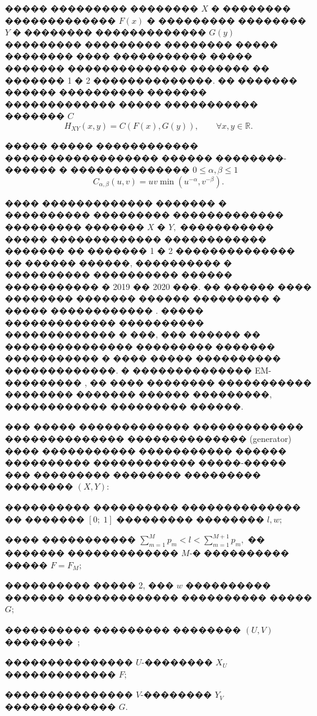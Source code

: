 \documentclass[11pt]{ubs}
\begin{document}
����� ��������� �������� $X$ � �������� ������������� $F(x)$ �   ��������� �������� $ Y$ � �������� ������������� $G (y)$ ��������� ��������� �������� ����� �������� ���� ����������� ����� ������� �������������� ������� �� ������� 1 � 2 ��������������.
�� ������� ������ \cite{nelsen2006introduction} ���������� ������� ������������� ����� ����������� ������� $C$
\begin{equation}\label{eq:Copula_H}
  H_{XY}(x,y)=C(F (x), G(y)), \qquad \forall x,y\in \mathbb{R}.
\end{equation}
\noindent



�����   ����� ������������ ������������������ ������ ��������-��\-��\-�� \cite{marshall1996copulas, Quesada} � �������������� $0\leqslant\alpha,\beta\leqslant1$
\begin{equation} \label{eq:copula}
  C_{\alpha,\beta}(u,v)=uv \min {(u^{-\alpha},v^{-\beta} )}.
\end{equation}


���� ������������� ������� � ���������� ��������� ������������� ��������� ������� $X$ � $Y,$ ����������� ����� ������������� ������������ ������� �� ������� 1 � 2 �������������� �� ������ ������, ���������� � ���������� ���������� ������ ����������� � 2019 �� 2020 ���. 
�� ������ ���� �������� ������� ������ ��������� � ����� ������������ \cite{Epanechnikov}. ����� ������������� ���������� ������������� � ���, ��� ������ �� ��������������� ��������� ������� ����������� � ���� ����� ���������� �������������. 
� �������������� EM-��������� \cite{EM}, �� ���� �������� ����������� �������� ������� ������ ���������, ������������ ��������� ������.



��� ����� ������������� �������������  �������������� �������������� (generator) ���� ����������� ����������� ������ ���������� ������������ �����-����� ���  ���������  �������� ��������� �������� $(X,Y)$:
\begin{description}[itemsep=-3pt]
  \item [\sf{���� 1:}] ���������� ���������� �������������� �� ������� $[0;\;1]$ ��������� �������� ${l}, {w};$
  \item [\sf{���� 2:}] ���� ����������� $\sum\limits_{m=1}^{M} p_m <{l}< \sum\limits_{m=1}^{M+1}p_m,$ �� ������� ������������� $M$-� ���������� �����  $F = F_M;$
  \item [\sf{���� 3:}] ���������� ����� 2, ��� ${w}$ ���������� ������� ������������� ���������� ����� $G;$
  \item [\sf{���� 4:}] ���������� ��������� �������� $(U,V)$ ��������~{\cite{nelsen2006introduction}};
  \item [\sf{���� 5:}] ��������������� $U$-�������� $X_U$ ������������� $F;$
  \item [\sf{���� 6:}] ��������������� $V$-�������� $Y_V$ ������������� $G.$
\end{description}
\end{document}
